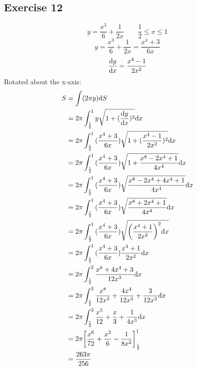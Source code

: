 \documentclass{math}
\begin{document}
\subsection*{Exercise 12}
\[ y = \frac{x^{3}}{6}+\frac{1}{2x} \quad \quad \frac{1}{2} \leq x \leq 1 \]
\[ y = \frac{x^{3}}{6}+\frac{1}{2x} = \frac{x^{4}+3}{6x} \]
\[ \frac{\mathrm{d}{y}}{\mathrm{d}{x}} = \frac{x^{4}-1}{2x^{2}} \]
Rotated about the x-axis:
\begin{align*}
  S &= \int(2\pi y)\mathrm{d}{S} \\
  &= 2\pi\int_{\frac{1}{2}}^{1}{
    y\sqrt{1+(\frac{\mathrm{d}{y}}{\mathrm{d}{x}})^{2}}\mathrm{d}{x}} \\
  &= 2\pi\int_{\frac{1}{2}}^{1}{(\frac{x^{4}+3}{6x})
    \sqrt{1+(\frac{x^{4}-1}{2x^{2}})^{2}}\mathrm{d}{x}} \\
  &= 2\pi\int_{\frac{1}{2}}^{1}{(\frac{x^{4}+3}{6x})
    \sqrt{1+\frac{x^{8}-2x^{4}+1}{4x^{4}}}\mathrm{d}{x}} \\
  &= 2\pi\int_{\frac{1}{2}}^{1}{(\frac{x^{4}+3}{6x})
    \sqrt{\frac{x^{8}-2x^{4}+4x^{4}+1}{4x^{4}}}\mathrm{d}{x}} \\
  &= 2\pi\int_{\frac{1}{2}}^{1}{(\frac{x^{4}+3}{6x})
    \sqrt{\frac{x^{8}+2x^{4}+1}{4x^{4}}}\mathrm{d}{x}} \\
  &= 2\pi\int_{\frac{1}{2}}^{1}{(\frac{x^{4}+3}{6x})
    \sqrt{\bigg(\frac{x^{4}+1}{2x^{2}}\bigg)^{2}\mathrm{d}{x}}} \\
  &= 2\pi\int_{\frac{1}{2}}^{1}{(\frac{x^{4}+3}{6x})
    \frac{x^{4}+1}{2x^{2}}\mathrm{d}{x}} \\
  &= 2\pi\int_{\frac{1}{2}}^{2}{\frac{x^{8}+4x^{4}+3}{12x^{3}}\mathrm{d}{x}} \\
  &= 2\pi\int_{\frac{1}{2}}^{2}{
    \frac{x^{8}}{12x^{3}}+\frac{4x^{4}}{12x^{3}}+\frac{3}{12x^{3}}\mathrm{d}{x}} \\
  &= 2\pi\int_{\frac{1}{2}}^{2}{
    \frac{x^{5}}{12}+\frac{x}{3}+\frac{1}{4x^{3}}\mathrm{d}{x}} \\
  &= 2\pi\bigg[\frac{x^{6}}{72}+\frac{x^{2}}{6}-\frac{1}{8x^{2}}\bigg]
    _{\frac{1}{2}}^{1} \\
  &= \frac{263\pi}{256}
\end{align*}
\end{document}
